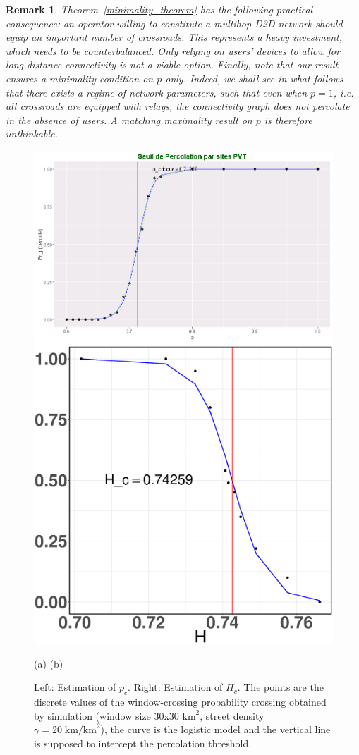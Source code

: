 \documentclass[conference]{IEEEtran}
\newtheorem{remark}{Remark}
\begin{document}
\begin{remark}
Theorem~\ref{minimality_theorem} has the following practical consequence: an operator willing to constitute a multihop D2D network should equip an important number of crossroads. %
This represents a heavy investment, which needs to be counterbalanced. Only relying on users' devices to allow for long-distance connectivity is not a viable option. Finally, note that our result ensures a minimality condition on $p$ only. Indeed, we shall see in what follows that 
there exists a regime of network parameters, such that even when $p=1$, i.e. all crossroads are equipped with relays, the connectivity graph does not percolate in the absence of users. A matching maximality result on $p$ is therefore unthinkable.
\end{remark}

\begin{figure}[t!]
\centerline{
\includegraphics[width=0.48\linewidth]{Figures/Site-threshold-PVT}
\hspace{0.01\linewidth}
\includegraphics[width=0.48\linewidth]{Figures/sites-H_c-p=1}}
\vspace{-1ex}
\centerline{\footnotesize\hspace{0.25\linewidth} (a)\hspace{0.5\linewidth} (b) \hspace{0.25\linewidth}\ }
\vspace{-1ex}
\caption{Left: Estimation of $p_c$. Right: Estimation of $H_c$.
The points are the discrete values of the window-crossing probability
crossing obtained by simulation (window size 30x30 $\text{km}^{2}$, street density $\gamma = 20 \; \text{km/km}^{2}$), the curve is the logistic model and the vertical line is supposed to intercept the percolation threshold.}
\label{p-H-thresholds}
\vspace{-3ex}
\end{figure}
\end{document}
